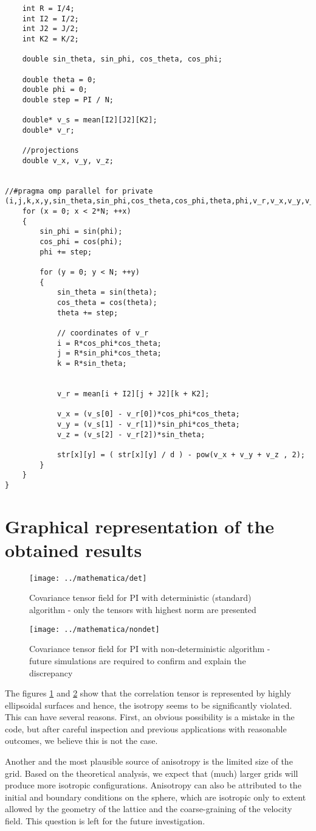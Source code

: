 \begin{lstlisting}
	int R = I/4;
	int I2 = I/2;
	int J2 = J/2;
	int K2 = K/2;
	
	double sin_theta, sin_phi, cos_theta, cos_phi;

	double theta = 0;
	double phi = 0;
	double step = PI / N;
	
	double* v_s = mean[I2][J2][K2];
	double* v_r;

	//projections
	double v_x, v_y, v_z;


//#pragma omp parallel for private (i,j,k,x,y,sin_theta,sin_phi,cos_theta,cos_phi,theta,phi,v_r,v_x,v_y,v_z)
	for (x = 0; x < 2*N; ++x)
	{
		sin_phi = sin(phi);
		cos_phi = cos(phi);
		phi += step;	
		
		for (y = 0; y < N; ++y)
		{
			sin_theta = sin(theta);
			cos_theta = cos(theta);
			theta += step;
			
			// coordinates of v_r
			i = R*cos_phi*cos_theta;
			j = R*sin_phi*cos_theta;
			k = R*sin_theta;


			v_r = mean[i + I2][j + J2][k + K2];

			v_x = (v_s[0] - v_r[0])*cos_phi*cos_theta;
			v_y = (v_s[1] - v_r[1])*sin_phi*cos_theta;
			v_z = (v_s[2] - v_r[2])*sin_theta;
			
			str[x][y] = ( str[x][y] / d ) - pow(v_x + v_y + v_z , 2);	
		}
	}
}
\end{lstlisting}

\section{Graphical representation of the obtained results}

\begin{figure}[h] 
 \centering  \label{tendet}
 \texttt{[image: ../mathematica/det]}
 \caption{Covariance tensor field for PI with deterministic (standard) algorithm - only the tensors with highest norm are presented}
\end{figure}

\begin{figure}[h] 
 \centering \label{tennot}
 \texttt{[image: ../mathematica/nondet]}
 \caption{Covariance tensor field for PI with non-deterministic algorithm - future simulations are required to confirm and explain the discrepancy}
\end{figure}

The figures \ref{tendet} and \ref{tennot} show that the correlation tensor is represented by highly ellipsoidal surfaces and hence, the isotropy seems to be significantly violated. This can have several reasons. First, an obvious possibility is a mistake in the code, but after careful inspection and previous applications with reasonable outcomes, we believe this is not the case.

Another and the most plausible source of anisotropy is the limited size of the grid. Based on the theoretical analysis, we expect that (much) larger grids will produce more isotropic configurations. Anisotropy can also be attributed to the initial and boundary conditions on the sphere, which are isotropic only to extent allowed by the geometry of the lattice and the coarse-graining of the velocity field. This question is left for the future investigation.